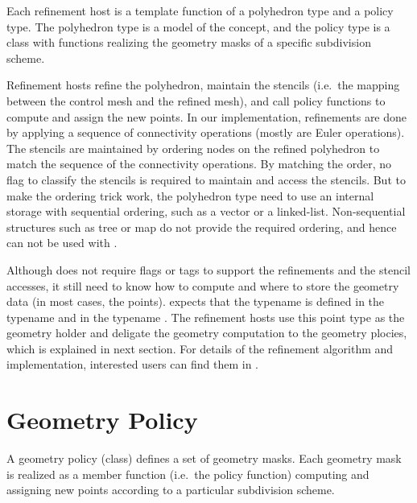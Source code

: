 
Each refinement host is a template function of
a polyhedron type and a policy type. The polyhedron type is
a model of the  concept, and the
policy type is a class with functions realizing the 
geometry masks of a specific subdivision scheme.

Refinement hosts refine the polyhedron, maintain the stencils 
(i.e.~the mapping between the control mesh and the refined mesh), 
and call policy functions to compute and assign the new points. 
In our implementation, refinements are done by applying a 
sequence of connectivity operations (mostly are Euler operations).
The stencils are maintained by ordering nodes on the refined 
polyhedron to match the sequence of the connectivity operations. 
By matching the order, no flag to classify the stencils 
is required to maintain and access the stencils.
But to make the ordering trick work, the polyhedron type need 
to use an internal storage with sequential ordering, such as
a vector or a linked-list. Non-sequential structures such as 
tree or map do not provide the required ordering, and hence
can not be used with .
 
Although  does not require flags or 
tags to support the refinements and the stencil accesses, it
still need to know how to compute and where to store the geometry
data (in most cases, the points).  
expects that the typename  is 
defined in the typename  and in 
the typename . The refinement hosts use
this point type as the geometry holder and deligate the geometry
computation to the geometry plocies, which is explained in next section.  
For details of the refinement algorithm and implementation, 
interested users can find them in \cite{cgal:sp-mrbee-05}.

\section{Geometry Policy}
A geometry policy (class) defines a set of geometry masks. 
Each geometry mask is realized as a member function (i.e.~the 
policy function) computing and assigning new points according 
to a particular subdivision scheme. 

